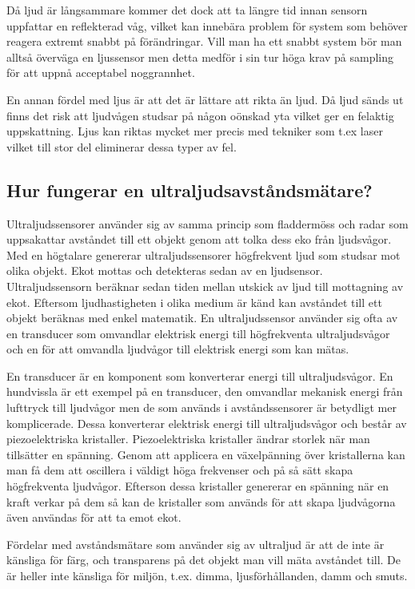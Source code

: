 \documentclass[a4paper,12pt,fleqn]{article}
\begin{document}
Då ljud är långsammare kommer det dock att ta längre tid innan sensorn uppfattar en reflekterad våg, vilket kan innebära problem för system som behöver reagera extremt snabbt på förändringar. Vill man ha ett snabbt system bör man alltså överväga en ljussensor men detta medför i sin tur höga krav på sampling för att uppnå acceptabel noggrannhet.

En annan fördel med ljus är att det är lättare att rikta än ljud. Då ljud sänds ut finns det risk att ljudvågen studsar på någon oönskad yta vilket ger en felaktig uppskattning.
Ljus kan riktas mycket mer precis med tekniker som t.ex laser vilket till stor del eliminerar dessa typer av fel.



\subsection{Hur fungerar en ultraljudsavståndsmätare?}
Ultraljudssensorer använder sig av samma princip som fladdermöss och radar som uppsakattar avståndet till ett objekt genom att tolka dess eko från ljudsvågor. Med en högtalare genererar ultraljudssensorer högfrekvent ljud som studsar mot olika objekt. Ekot mottas och detekteras sedan av en ljudsensor. Ultraljudssensorn beräknar sedan tiden mellan utskick av ljud till mottagning av ekot. Eftersom ljudhastigheten i olika medium är känd kan avståndet till ett objekt beräknas med enkel matematik. En ultraljudssensor använder sig ofta av en transducer som omvandlar elektrisk energi till högfrekventa ultraljudsvågor och en för att omvandla ljudvågor till elektrisk energi som kan mätas.

En transducer är en komponent som konverterar energi till ultraljudsvågor. En hundvissla är ett exempel på en transducer, den omvandlar mekanisk energi från lufttryck till ljudvågor men de som används i avståndssensorer är betydligt mer komplicerade. Dessa konverterar elektrisk energi till ultraljudsvågor och består av piezoelektriska kristaller. Piezoelektriska kristaller ändrar storlek när man tillsätter en spänning. Genom att applicera en växelpänning över kristallerna kan man få dem att oscillera i väldigt höga frekvenser och på så sätt skapa högfrekventa ljudvågor. Efterson dessa kristaller genererar en spänning när en kraft verkar på dem så kan de kristaller som används för att skapa ljudvågorna även användas för att ta emot ekot.

Fördelar med avståndsmätare som använder sig av ultraljud är att de inte är känsliga för färg, och transparens på det objekt man vill mäta avståndet till. De är heller inte känsliga för miljön, t.ex. dimma, ljusförhållanden, damm och smuts.
\end{document}
